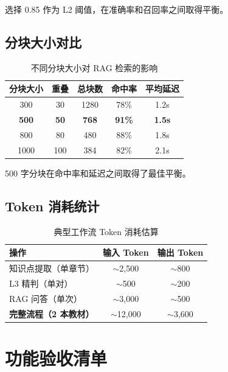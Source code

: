 \documentclass[12pt,a4paper]{article}
\begin{document}
选择 0.85 作为 L2 阈值，在准确率和召回率之间取得平衡。

\subsection{分块大小对比}

\begin{table}[H]
\centering
\caption{不同分块大小对 RAG 检索的影响}
\begin{tabular}{ccccc}
\toprule
\textbf{分块大小} & \textbf{重叠} & \textbf{总块数} & \textbf{命中率} & \textbf{平均延迟} \\
\midrule
300 & 30 & 1280 & 78\% & 1.2s \\
\textbf{500} & \textbf{50} & \textbf{768} & \textbf{91\%} & \textbf{1.5s} \\
800 & 80 & 480 & 88\% & 1.8s \\
1000 & 100 & 384 & 82\% & 2.1s \\
\bottomrule
\end{tabular}
\end{table}

500 字分块在命中率和延迟之间取得了最佳平衡。

\subsection{Token 消耗统计}

\begin{table}[H]
\centering
\caption{典型工作流 Token 消耗估算}
\begin{tabular}{lcc}
\toprule
\textbf{操作} & \textbf{输入 Token} & \textbf{输出 Token} \\
\midrule
知识点提取（单章节） & $\sim$2,500 & $\sim$800 \\
L3 精判（单对） & $\sim$500 & $\sim$200 \\
RAG 问答（单次） & $\sim$3,000 & $\sim$500 \\
\midrule
\textbf{完整流程（2 本教材）} & $\sim$12,000 & $\sim$3,600 \\
\bottomrule
\end{tabular}
\end{table}

\section{功能验收清单}
\label{sec:checklist}
\end{document}
